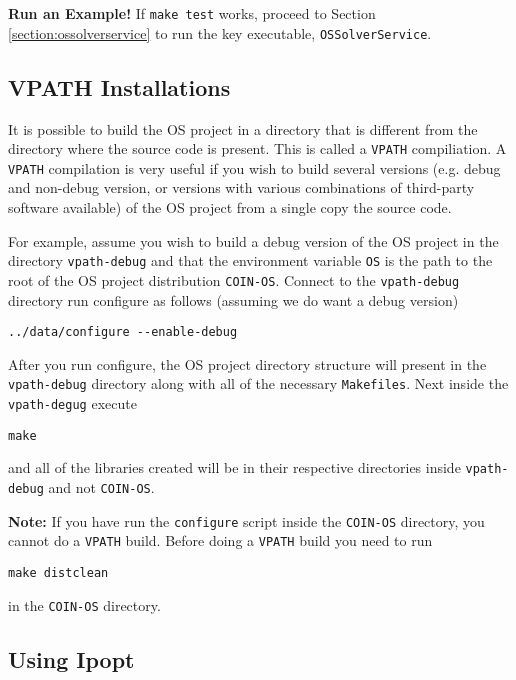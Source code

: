 \documentclass[11pt]{article}
\renewcommand{\_}{{\char"5F}}
\renewcommand{\{}{{\char"7B}}
\renewcommand{\}}{{\char"7D}}
\renewcommand{\^}{{\char"0D}}
\renewcommand{\'}{{\char"0D}}
\begin{document}
 
{\bf Run an Example!}  If {\tt make test} works, proceed to Section \ref{section:ossolverservice} to run the key executable, {\tt OSSolverService}. 








\subsection{VPATH Installations}


It is possible to build the OS project in a directory that is different from the directory where the source code is present. This is called a {\tt VPATH}  compiliation.  A {\tt VPATH}  compilation  is very useful if you wish to build several versions (e.g. debug and non-debug version, or versions with various combinations of third-party software available) of the OS project from a single copy the source code.

For  example, assume you wish to build a debug version of the OS project in the directory {\tt vpath-debug} and that the environment variable {\tt OS} is the path to the root of the OS project distribution {\tt COIN-OS}.  Connect to the {\tt vpath-debug} directory run configure as follows (assuming we do want a debug version)

\begin{verbatim}
../data/configure --enable-debug
\end{verbatim}

After you run configure, the OS project directory structure will present in the {\tt vpath-debug} directory along with all of the necessary  {\tt Makefiles}.  Next inside the {\tt vpath-degug} execute

\begin{verbatim}
make
\end{verbatim}

and all of  the libraries created will be in their respective directories inside {\tt vpath-debug}  and not {\tt COIN-OS}.

{\bf Note:}  If you have run the {\tt configure} script inside the {\tt COIN-OS} directory, you cannot do a {\tt VPATH} build. Before doing a {\tt VPATH} build you need to run 
\begin{verbatim}
make distclean
\end{verbatim}
in the {\tt COIN-OS} directory.
 

\subsection{Using Ipopt}\label{section:ipopt}
\end{document}
